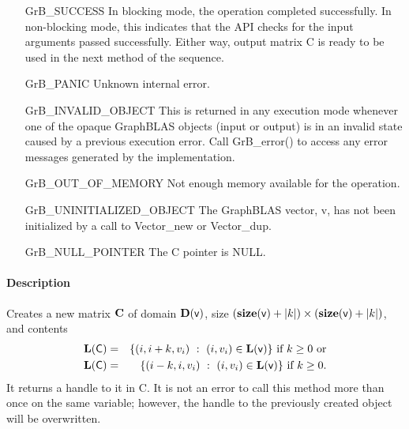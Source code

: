 \begin{itemize}[leftmargin=2.1in]
    \item[{\sf GrB\_SUCCESS}]         In blocking mode, the operation completed
    successfully. In non-blocking mode, this indicates that the API checks 
    for the input arguments passed successfully. Either way, output matrix 
    {\sf C} is ready to be used in the next method of the sequence.

    \item[{\sf GrB\_PANIC}]           Unknown internal error.
    
    \item[{\sf GrB\_INVALID\_OBJECT}] This is returned in any execution mode 
    whenever one of the opaque GraphBLAS objects (input or output) is in an invalid 
    state caused by a previous execution error.  Call {\sf GrB\_error()} to access 
    any error messages generated by the implementation.

    \item[{\sf GrB\_OUT\_OF\_MEMORY}] Not enough memory available for the operation.
    
    \item[{\sf GrB\_UNINITIALIZED\_OBJECT}]  The GraphBLAS vector, {\sf v}, has 
    not been initialized by a call to {\sf Vector\_new} or {\sf Vector\_dup}.
    
    \item[{\sf GrB\_NULL\_POINTER}]   The {\sf C} pointer is {\sf NULL}.
\end{itemize}

\paragraph{Description}

Creates a new matrix ${\bf C}$ of domain $\mathbf{D}({\sf v})$, size 
$(\mathbf{size}({\sf v}) + |k|) \times (\mathbf{size}({\sf v}) + |k|)$, and contents 
\begin{eqnarray*}
\mathbf{L}({\sf C}) & = & \{ (i, i + k, v_i) ~:~ (i, v_i) \in \mathbf{L}({\sf v})\} \mbox{~if~} k \ge 0
\mbox{~or} \\
\mathbf{L}({\sf C}) & = & \{ (i - k, i, v_i) ~:~ (i, v_i) \in \mathbf{L}({\sf v})\} \mbox{~if~} k \ge 0.
\end{eqnarray*}
It returns a handle to it in {\sf C}.  It is not an error to call this method 
more than once on the same variable; however, the handle to the previously 
created object will be overwritten. 

